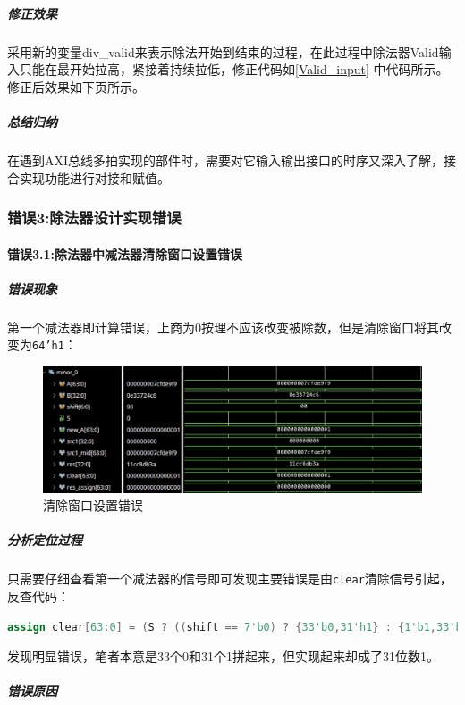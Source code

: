 \documentclass[UTF-8,twoside,c5size]{ctexart}
\begin{document}
	\subparagraph{修正效果}\hfill
	
	采用新的变量div\_valid来表示除法开始到结束的过程，在此过程中除法器Valid输入只能在最开始拉高，紧接着持续拉低，修正代码如\ref{Valid_input} 中代码所示。修正后效果如下页所示。
	
	\subparagraph{总结归纳}\hfill
	
	在遇到AXI总线多拍实现的部件时，需要对它输入输出接口的时序又深入了解，接合实现功能进行对接和赋值。
	
	\subsubsection{错误\textbf{3:}除法器设计实现错误}
	
	\paragraph{错误\textbf{3.1:}除法器中减法器清除窗口设置错误}
	
	\subparagraph{错误现象}\hfill
	
	第一个减法器即计算错误，上商为0按理不应该改变被除数，但是清除窗口将其改变为\texttt{64'h1}：
	
	\begin{figure}[h]
		\centering
		\includegraphics[width=0.85\linewidth]{figures/div_error_clear.png}
		\caption{清除窗口设置错误}
		\label{fig:diverrorclear}
	\end{figure}
	
	\subparagraph{分析定位过程}\hfill
	
	只需要仔细查看第一个减法器的信号即可发现主要错误是由\texttt{clear}清除信号引起，反查代码：
	
	\begin{lstlisting}[language=verilog]
		assign clear[63:0] = (S ? ((shift == 7'b0) ? {33'b0,31'h1} : {1'b1,33'b0,30'h1} >>> (shift-1)) : 64'h1);
	\end{lstlisting}

	发现明显错误，笔者本意是33个0和31个1拼起来，但实现起来却成了31位数1。
	
	\subparagraph{错误原因}\hfill
	
\end{document}
